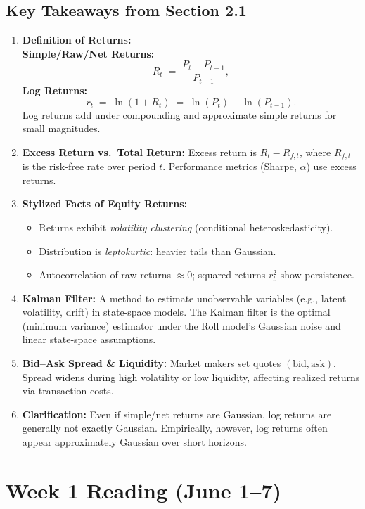 \documentclass[11pt]{amsart}
\begin{document}
\subsection{Key Takeaways from Section 2.1}
\begin{enumerate}[noitemsep,left=0pt]
  \item \textbf{Definition of Returns:} \\
  \textbf{Simple/Raw/Net Returns:}
    \[
      R_t \;=\; \frac{P_t - P_{t-1}}{P_{t-1}}, 
    \]
    \textbf{Log Returns:}
    \[
      r_t \;=\; \ln(1 + R_t) \;=\; \ln(P_t) - \ln(P_{t-1}).
    \]
    Log returns add under compounding and approximate simple returns for small magnitudes.
  \item \textbf{Excess Return vs.\ Total Return:}  
    Excess return is $R_t - R_{f,t}$, where $R_{f,t}$ is the risk‐free rate over period $t$. Performance metrics (Sharpe, $\alpha$) use excess returns.
  \item \textbf{Stylized Facts of Equity Returns:}
    \begin{itemize}[noitemsep,left=2em]
      \item Returns exhibit \emph{volatility clustering} (conditional heteroskedasticity).
      \item Distribution is \emph{leptokurtic}: heavier tails than Gaussian.
      \item Autocorrelation of raw returns $\approx 0$; squared returns \( r_t^2 \) show persistence.
    \end{itemize}
  \item \textbf{Kalman Filter:}  
    A method to estimate unobservable variables (e.g., latent volatility, drift) in state‐space models. The Kalman filter is the optimal (minimum variance) estimator under the Roll model's Gaussian noise and linear state‐space assumptions.
  \item \textbf{Bid–Ask Spread \& Liquidity:}  
    Market makers set quotes $(\text{bid}, \text{ask})$. Spread widens during high volatility or low liquidity, affecting realized returns via transaction costs.
  \item \textbf{Clarification:} Even if simple/net returns are Gaussian, log returns are generally not exactly Gaussian. Empirically, however, log returns often appear approximately Gaussian over short horizons.
\end{enumerate}

\section{Week 1 Reading (June 1–7)}
\end{document}
